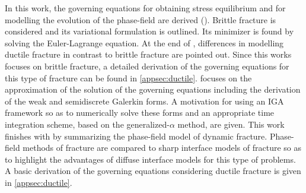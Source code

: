 In this work, the governing equations for obtaining stress equilibrium and for modelling the evolution of the phase-field are derived (). Brittle fracture is considered and its variational formulation is outlined. Its minimizer is found by solving the Euler-Lagrange equation. At the end of , differences in modelling ductile fracture in contrast to brittle fracture are pointed out. Since this works focuses on brittle fracture, a detailed derivation of the governing equations for this type of fracture can be found in \ref{appsec:ductile}.  focuses on the approximation of the solution of the governing equations including the derivation of the weak and semidiscrete Galerkin forms. A motivation for using an IGA framework so as to numerically solve these forms and an appropriate time integration scheme, based on the generalized-$\alpha$ method, are given. This work finishes with  by summarizing the phase-field model of dynamic fracture. Phase-field methods of fracture are compared to sharp interface models of fracture so as to highlight the advantages of diffuse interface models for this type of problems. A basic derivation of the governing equations considering ductile fracture is given in \ref{appsec:ductile}.




